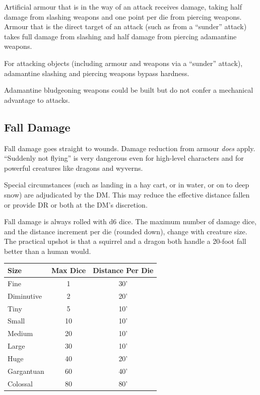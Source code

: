 Artificial armour that is in the way of an attack receives damage, taking
half damage from slashing weapons and one point per die from piercing
weapons. Armour that is the direct target of an attack (such as from a
``sunder'' attack) takes full damage from slashing and half damage from
piercing adamantine weapons.

For attacking objects (including armour and weapons via a ``sunder'' attack),
adamantine slashing and piercing weapons bypass hardness.

Adamantine bludgeoning weapons could be built but do not confer a
mechanical advantage to attacks.

%
\subsection{Fall Damage}

Fall damage goes straight to wounds. Damage reduction from armour
\textit{does} apply. ``Suddenly not flying'' is very dangerous even for
high-level characters and for powerful creatures like dragons and wyverns.

Special circumstances (such as landing in a hay cart, or in water, or on to
deep snow) are adjudicated by the DM. This may reduce the effective distance
fallen or provide DR or both at the DM's discretion.

Fall damage is always rolled with d6 dice. The maximum number of damage
dice, and the distance increment per die (rounded down), change with
creature size. The practical upshot is that a squirrel and a dragon both
handle a 20-foot fall better than a human would.

\begin{tabular}{lcc} \hline
\textbf{Size} & \textbf{Max Dice} & \textbf{Distance Per Die} \\ \hline
Fine & 1 & 30' \\
Diminutive & 2 & 20' \\
Tiny & 5 & 10' \\
\hline
Small & 10 & 10' \\
Medium & 20 & 10' \\
Large & 30 & 10' \\
\hline
Huge & 40 & 20' \\
Gargantuan & 60 & 40' \\
Colossal & 80 & 80' \\
\hline
\end{tabular}

